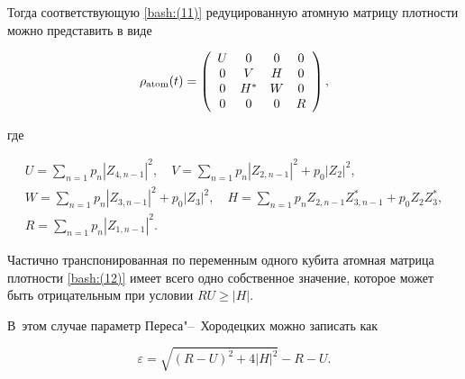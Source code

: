Тогда соответствующую \eqref{bash:(11)}  редуцированную атомную матрицу   плотности можно представить в виде

\begin{equation}

\rho_{\rm atom}(t)= \left(

  \begin{array}{cccc}

    U & 0 & 0 & 0 \\

    0 & V & H & 0 \\

    0 & H^* & W & 0 \\

    0 & 0 & 0 & R \\

  \end{array}

\right),

\label{bash:(12)}

\end{equation}

где

\begin{gather}

 U = \sum\limits_{n=1} p_n |Z_{4,n-1}|^2, \quad 

 V =\sum\limits_{n=1} p_n |Z_{2,n-1}|^2 + p_0 |Z_{2}|^2, \\

 W =\sum\limits_{n=1} p_n |Z_{3,n-1}|^2 + p_0 |Z_{3}|^2, \quad 

H =\sum\limits_{n=1} p_n Z_{2,n-1} Z^*_{3,n-1} + p_0 Z_{2} Z^*_{3},\\

R = \sum\limits_{n=1} p_n |Z_{1,n-1}|^2.

\end{gather}



Частично транспонированная по переменным одного кубита атомная матрица плотности \eqref{bash:(12)} имеет всего одно собственное значение, которое может быть отрицательным при условии $RU  \geq |H|$.

В~этом случае параметр Переса"--~Хородецких можно записать как

\begin{equation}

\varepsilon = \sqrt{(R-U)^2 + 4|H|^2} -R - U. \label{bash:(13)}

\end{equation}

